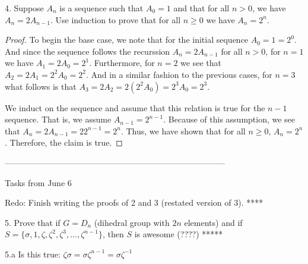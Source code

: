 \documentclass[a4paper,12pt]{article}
\begin{document}
4. Suppose $A_n$ is a sequence such that $A_0 = 1$ and that for all $n > 0$, we have $A_n = 2A_{n-1}$. Use induction to prove that for all $n\geq0$ we have $A_n = 2^n$.

\begin{proof}
    To begin the base case, we note that for the initial sequence $A_0 = 1 = 2^0$. And since the sequence follows the recurssion $A_n = 2A_{n-1}$ for all $n > 0$, for $n = 1$ we have $A_1 = 2 A_0 =2^1$. Furthermore, for $n =2$ we see that $A_2 = 2 A_1 = 2^2 A_0 = 2^2$. And in a similar fashion to the previous cases, for $n = 3$ what follows is that $A_3 = 2 A_2 = 2 (2^2 A_0) = 2^3 A_0 = 2^3$. 

    We induct on the sequence and assume that this relation is true for the $n-1$ sequence. That is, we assume $A_{n-1} = 2^{n-1}$. Because of this assumption, we see that $A_n = 2 A_{n-1} = 2 2^{n-1}= 2^n$. Thus, we have shown that for all $n \geq 0$, $A_n = 2^n$. Therefore, the claim is true.

\end{proof}


\newpage
--------------------------------------------------------------------------------

Tasks from June 6


Redo: Finish writing the proofs of 2 and 3 (restated version of 3). ****

5. Prove that if $G = D_n$ (dihedral group with $2n$ elements) and if $S = \{\sigma, 1, \zeta, \zeta^2 , \zeta^3 , \ldots , \zeta^{n-1}\}$, then $S$ is awesome (????) *****


5.a Is this true: $\zeta \sigma = \sigma \zeta^{n-1} = \sigma \zeta^{-1}$
\end{document}
